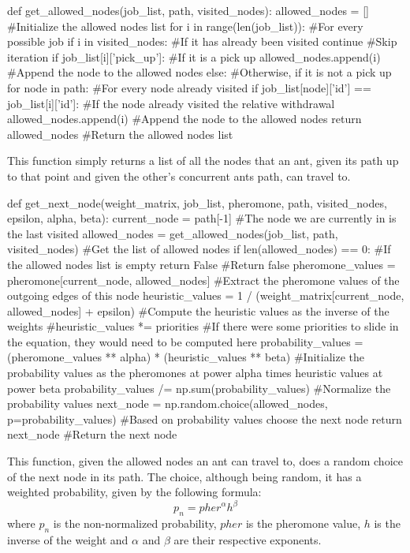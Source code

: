 \documentclass[titlepage]{article}
\begin{document}
\begin{python}
def get_allowed_nodes(job_list, path, visited_nodes):
    allowed_nodes = [] #Initialize the allowed nodes list
    for i in range(len(job_list)): #For every possible job
        if i in visited_nodes: #If it has already been visited
            continue #Skip iteration
        if job_list[i]['pick_up']: #If it is a pick up
            allowed_nodes.append(i) #Append the node to the allowed nodes
        else: #Otherwise, if it is not a pick up
            for node in path: #For every node already visited
                if job_list[node]['id'] == job_list[i]['id']: #If the node already visited the relative withdrawal
                    allowed_nodes.append(i) #Append the node to the allowed nodes
    return allowed_nodes #Return the allowed nodes list
\end{python}

This function simply returns a list of all the nodes that an ant, given its path up to that point and given the other's concurrent ants path, can travel to.

\begin{python}
def get_next_node(weight_matrix, job_list, pheromone, path, visited_nodes, epsilon, alpha, beta):
    current_node = path[-1] #The node we are currently in is the last visited
    allowed_nodes = get_allowed_nodes(job_list, path, visited_nodes) #Get the list of allowed nodes
    if len(allowed_nodes) == 0: #If the allowed nodes list is empty
        return False #Return false
    pheromone_values = pheromone[current_node, allowed_nodes] #Extract the pheromone values of the outgoing edges of this node
    heuristic_values = 1 / (weight_matrix[current_node, allowed_nodes] + epsilon) #Compute the heuristic values as the inverse of the weights
    #heuristic_values *= priorities #If there were some priorities to slide in the equation, they would need to be computed here
    probability_values = (pheromone_values ** alpha) * (heuristic_values ** beta) #Initialize the probability values as the pheromones at power alpha times heuristic values at power beta
    probability_values /= np.sum(probability_values) #Normalize the probability values
    next_node = np.random.choice(allowed_nodes, p=probability_values) #Based on probability values choose the next node
    return next_node #Return the next node
\end{python}

This function, given the allowed nodes an ant can travel to, does a random choice of the next node in its path. The choice, although being random, it has a weighted probability, given by the following formula:
\begin{equation}
    p_n = {pher}^{\alpha}h^{\beta}
\end{equation}
where $p_n$ is the non-normalized probability, ${pher}$ is the pheromone value, $h$ is the inverse of the weight and $\alpha$ and $\beta$ are their respective exponents.
\end{document}
